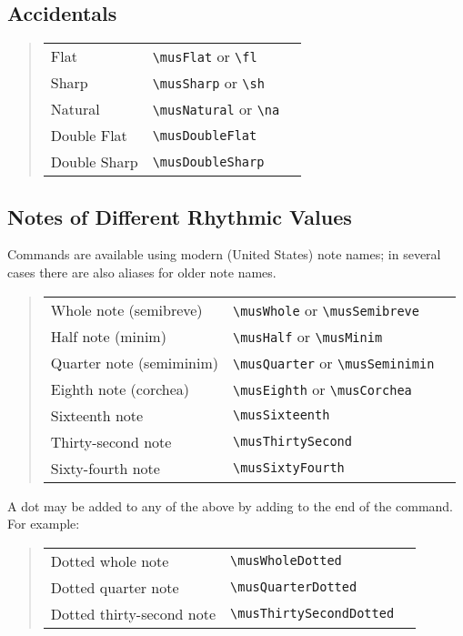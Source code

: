 \documentclass{article}
\newenvironment{codetable}
{\begin{quote}\begin{tabular}{lll}}
{\end{tabular}\end{quote}}
\begin{document}
\subsection{Accidentals}

\begin{codetable}
    Flat & \verb|\musFlat| or \verb|\fl| & \musFlat\\
    Sharp & \verb|\musSharp| or \verb|\sh| & \musSharp\\
    Natural & \verb|\musNatural| or \verb|\na| & \musNatural\\
    Double Flat & \verb|\musDoubleFlat| & \musDoubleFlat\\
    Double Sharp & \verb|\musDoubleSharp| & \musDoubleSharp\\
\end{codetable}

\subsection{Notes of Different Rhythmic Values}

Commands are available using modern (United States) note names; in several cases
there are also aliases for older note names.

\begin{codetable}
    Whole note (semibreve) & \verb|\musWhole| or \verb|\musSemibreve| &
    \musWhole\\
    Half note (minim) & \verb|\musHalf| or \verb|\musMinim| & \musHalf\\
    Quarter note (semiminim) & \verb|\musQuarter| or \verb|\musSeminimin| &
    \musQuarter\\
    Eighth note (corchea) & \verb|\musEighth| or \verb|\musCorchea| &
    \musEighth\\
    Sixteenth note & \verb|\musSixteenth| & \musSixteenth\\
    Thirty-second note & \verb|\musThirtySecond| & \musThirtySecond\\
    Sixty-fourth note & \verb|\musSixtyFourth| & \musSixtyFourth\\
\end{codetable}

A dot may be added to any of the above by adding  to the end of the
command. For example:

\begin{codetable}
    Dotted whole note & \verb|\musWholeDotted| & \musWholeDotted\\
    Dotted quarter note & \verb|\musQuarterDotted| & \musQuarterDotted\\
    Dotted thirty-second note & \verb|\musThirtySecondDotted| &
    \musThirtySecondDotted\\
\end{codetable}
\end{document}
